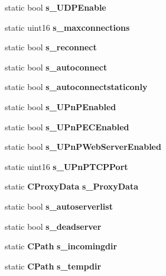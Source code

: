 \begin{DoxyCompactItemize}
\item 
static bool {\bfseries s\_\-UDPEnable}\label{classCPreferences_a44d0e9a6fd30a49618c59c1171eae385}

\item 
static uint16 {\bfseries s\_\-maxconnections}\label{classCPreferences_a12764466cb6cc23246800778723cce8d}

\item 
static bool {\bfseries s\_\-reconnect}\label{classCPreferences_a6026386adbdb8f25d5eae976ba95ad92}

\item 
static bool {\bfseries s\_\-autoconnect}\label{classCPreferences_ac71bcd35acab2989e293bbee4362894d}

\item 
static bool {\bfseries s\_\-autoconnectstaticonly}\label{classCPreferences_a8eb64e5200792e4d2b9112217595ee30}

\item 
static bool {\bfseries s\_\-UPnPEnabled}\label{classCPreferences_a7d92dfc75ec9a4e911866ba13af4149a}

\item 
static bool {\bfseries s\_\-UPnPECEnabled}\label{classCPreferences_a18ba54e7a6dcab4f9e57b6d072a164eb}

\item 
static bool {\bfseries s\_\-UPnPWebServerEnabled}\label{classCPreferences_a8ba6bb7d99eda5fa3e26cb0551fd0d1b}

\item 
static uint16 {\bfseries s\_\-UPnPTCPPort}\label{classCPreferences_a41d0694de8948aaed10dc283d821fe28}

\item 
static {\bf CProxyData} {\bfseries s\_\-ProxyData}\label{classCPreferences_ade8ea60632b5c0606ce2dbc1b869a47d}

\item 
static bool {\bfseries s\_\-autoserverlist}\label{classCPreferences_a3e03340db80ea7401c1129f5e460e594}

\item 
static bool {\bfseries s\_\-deadserver}\label{classCPreferences_a9ebb40eb778bb672e3cf199e3a067595}

\item 
static {\bf CPath} {\bfseries s\_\-incomingdir}\label{classCPreferences_a8546098adc3d358d290a792ac3cbd46a}

\item 
static {\bf CPath} {\bfseries s\_\-tempdir}\label{classCPreferences_a2fbfbcc79ca53cf24a934011126e6d49}


\end{DoxyCompactItemize}
